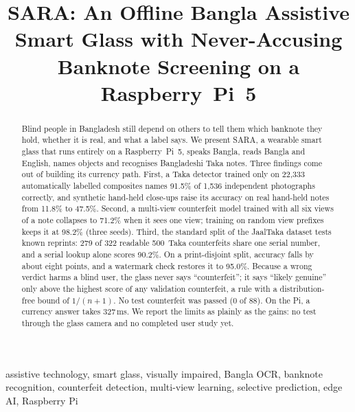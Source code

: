 \documentclass[conference]{IEEEtran}
\begin{document}
\title{SARA: An Offline Bangla Assistive Smart Glass with Never-Accusing Banknote Screening on a Raspberry~Pi~5}

\author{
}

\maketitle

\begin{abstract}
Blind people in Bangladesh still depend on others to tell them which banknote they hold, whether it is real, and what a label says. We present SARA, a wearable smart glass that runs entirely on a Raspberry~Pi~5, speaks Bangla, reads Bangla and English, names objects and recognises Bangladeshi Taka notes. Three findings come out of building its currency path. First, a Taka detector trained only on 22,333 automatically labelled composites names 91.5\% of 1,536 independent photographs correctly, and synthetic hand-held close-ups raise its accuracy on real hand-held notes from 11.8\% to 47.5\%. Second, a multi-view counterfeit model trained with all six views of a note collapses to 71.2\% when it sees one view; training on random view prefixes keeps it at 98.2\% (three seeds). Third, the standard split of the JaalTaka dataset tests known reprints: 279 of 322 readable 500~Taka counterfeits share one serial number, and a serial lookup alone scores 90.2\%. On a print-disjoint split, accuracy falls by about eight points, and a watermark check restores it to 95.0\%. Because a wrong verdict harms a blind user, the glass never says ``counterfeit''; it says ``likely genuine'' only above the highest score of any validation counterfeit, a rule with a distribution-free bound of $1/(n{+}1)$. No test counterfeit was passed (0 of 88). On the Pi, a currency answer takes 327\,ms. We report the limits as plainly as the gains: no test through the glass camera and no completed user study yet.
\end{abstract}

\begin{IEEEkeywords}
assistive technology, smart glass, visually impaired, Bangla OCR, banknote recognition, counterfeit detection, multi-view learning, selective prediction, edge AI, Raspberry Pi
\end{IEEEkeywords}
\end{document}
